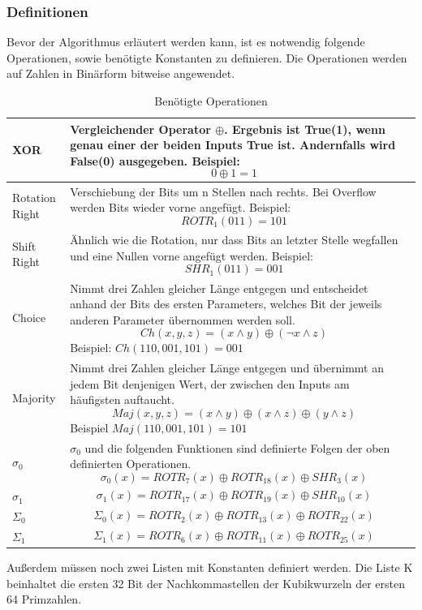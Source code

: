 \subsubsection{Definitionen}
Bevor der Algorithmus erläutert werden kann, ist es notwendig folgende Operationen, sowie benötigte Konstanten zu definieren. Die Operationen werden auf Zahlen in Binärform bitweise angewendet.
\begin{longtable}{p{3.5cm}p{10.5cm}l}
\caption{Benötigte Operationen}
	
		\\\toprule
		XOR  & Vergleichender Operator $\oplus$. Ergebnis ist True(1), wenn genau einer der beiden Inputs True ist. Andernfalls wird False(0) ausgegeben. Beispiel: $$0 \oplus 1 = 1$$
		\\\midrule
		Rotation Right  & Verschiebung der Bits um n Stellen nach rechts. Bei Overflow werden Bits wieder vorne angefügt. Beispiel: $$ROTR_1(011) = 101$$
		\\\midrule
		Shift Right  & Ähnlich wie die Rotation, nur dass Bits an letzter Stelle wegfallen und eine Nullen vorne angefügt werden. Beispiel: $$SHR_1(011) = 001$$
		\\\midrule
		Choice  & Nimmt drei Zahlen gleicher Länge entgegen und entscheidet anhand der Bits des ersten Parameters, welches Bit der jeweils anderen Parameter übernommen werden soll. $$Ch(x,y,z) = (x \land y)\oplus(\lnot x \land z)$$
		Beispiel: $Ch(110,001,101) = 001$
		\\\midrule
		Majority  & Nimmt drei Zahlen gleicher Länge entgegen und übernimmt an jedem Bit denjenigen Wert, der zwischen den Inputs am häufigsten auftaucht.
		$$Maj(x,y,z) = (x \land y)\oplus(x \land z)\oplus(y \land z)$$
		Beispiel $Maj(110,001,101) = 101$
		\\\midrule
		$\sigma_0$  & $\sigma_0$ und die folgenden Funktionen sind definierte Folgen der oben definierten Operationen.
		$$\sigma_0(x) = ROTR_7(x) \oplus ROTR_{18}(x) \oplus SHR_3(x)$$ 
		\\\midrule
		$\sigma_1$  & $$\sigma_1(x) = ROTR_{17}(x) \oplus ROTR_{19}(x) \oplus SHR_10(x)$$
		\\\midrule
		$\Sigma_0$  & $$\Sigma_0(x) = ROTR_2(x) \oplus ROTR_{13}(x) \oplus ROTR_22(x)$$
		\\\midrule
		$\Sigma_1$  & $$\Sigma_1(x) = ROTR_6(x) \oplus ROTR_{11}(x) \oplus ROTR_{25}(x)$$
		\\\bottomrule
\end{longtable}
Außerdem müssen noch zwei Listen mit Konstanten definiert werden. Die Liste K beinhaltet die ersten 32 Bit der Nachkommastellen der Kubikwurzeln der ersten 64 Primzahlen.
